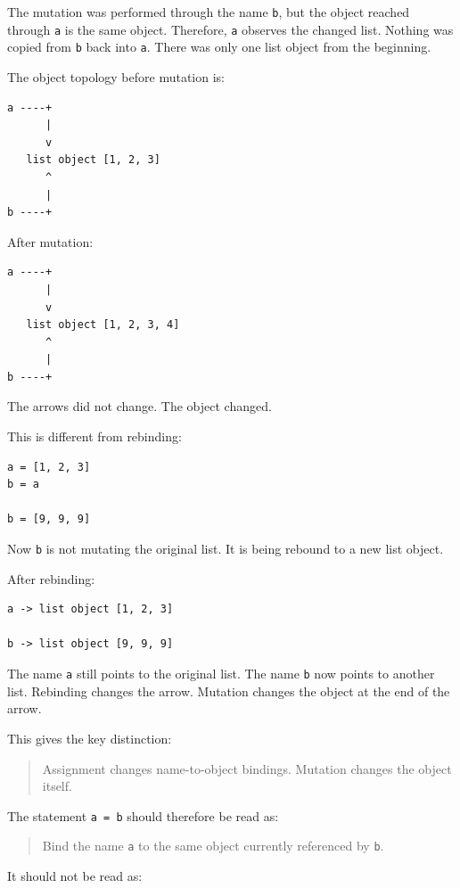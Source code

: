 The mutation was performed through the name \texttt{b}, but the object reached through \texttt{a} is the same object. Therefore, \texttt{a} observes the changed list. Nothing was copied from \texttt{b} back into \texttt{a}. There was only one list object from the beginning.

The object topology before mutation is:

\begin{verbatim}
a ----+
      |
      v
   list object [1, 2, 3]
      ^
      |
b ----+
\end{verbatim}

After mutation:

\begin{verbatim}
a ----+
      |
      v
   list object [1, 2, 3, 4]
      ^
      |
b ----+
\end{verbatim}

The arrows did not change. The object changed.

This is different from rebinding:

\begin{verbatim}
a = [1, 2, 3]
b = a

b = [9, 9, 9]
\end{verbatim}

Now \texttt{b} is not mutating the original list. It is being rebound to a new list object.

After rebinding:

\begin{verbatim}
a -> list object [1, 2, 3]

b -> list object [9, 9, 9]
\end{verbatim}

The name \texttt{a} still points to the original list. The name \texttt{b} now points to another list. Rebinding changes the arrow. Mutation changes the object at the end of the arrow.

This gives the key distinction:

\begin{quote}
Assignment changes name-to-object bindings. Mutation changes the object itself.
\end{quote}

The statement \texttt{a = b} should therefore be read as:

\begin{quote}
Bind the name \texttt{a} to the same object currently referenced by \texttt{b}.
\end{quote}

It should not be read as:

